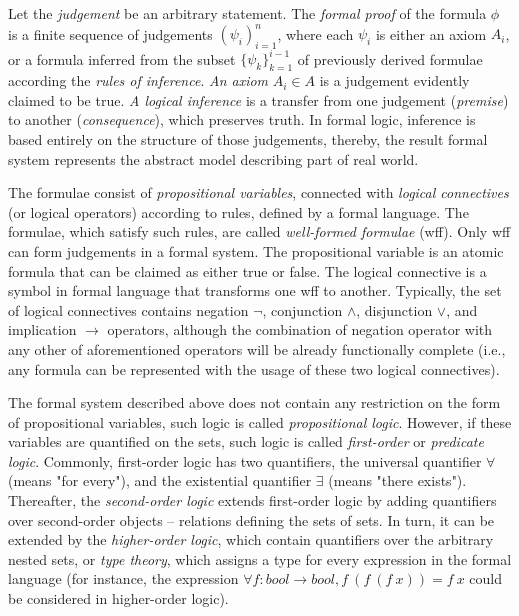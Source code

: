 \documentclass[article]{aaltoseries}
\begin{document}
Let the \textit{judgement} be an arbitrary statement. The \textit{formal proof} of the formula $\phi$ is a finite sequence of judgements $ ( \psi_i )_{i=1}^{n} $, where each $\psi_i$ is either an axiom $A_i$, or a formula inferred from the subset $\{ \psi_k \}_{k=1}^{i-1}$ of previously derived formulae according the \textit{rules of inference}. \textit{An axiom} $A_i \in A$ is a judgement evidently claimed to be true. \textit{A logical inference} is a transfer from one judgement (\textit{premise}) to another (\textit{consequence}), which preserves truth. In formal logic, inference is based entirely on the structure of those judgements, thereby, the result formal system represents the abstract model describing part of real world.

The formulae consist of \textit{propositional variables}, connected with \textit{logical connectives} (or logical operators) according to rules, defined by a formal language. The formulae, which satisfy such rules, are called \textit{well-formed formulae} (wff). Only wff can form judgements in a formal system. The propositional variable is an atomic formula that can be claimed as either true or false. The logical connective is a symbol in formal language that transforms one wff to another. Typically, the set of logical connectives contains negation $\neg$, conjunction $\land$, disjunction $\lor$, and implication $\rightarrow$ operators, although the combination of negation operator with any other of aforementioned operators will be already functionally complete (i.e., any formula can be represented with the usage of these two logical connectives).

The formal system described above does not contain any restriction on the form of propositional variables, such logic is called \textit{propositional logic}. However, if these variables are quantified on the sets, such logic is called \textit{first-order} or \textit{predicate logic}. Commonly, first-order logic has two quantifiers, the universal quantifier $\forall$ (means "for every"), and the existential quantifier $\exists$ (means "there exists"). Thereafter, the \textit{second-order logic} extends first-order logic by adding quantifiers over second-order objects -- relations defining the sets of sets. In turn, it can be extended by the \textit{higher-order logic}, which contain quantifiers over the arbitrary nested sets, or \textit{type theory}, which assigns a type for every expression in the formal language (for instance, the expression $\forall f: bool \rightarrow bool, f\ (f\ (f\ x)) = f\ x$ could be considered in higher-order logic).
\end{document}
